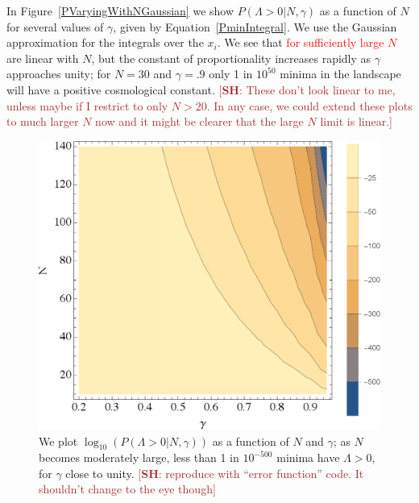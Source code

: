 \documentclass[12pt]{article}
\newcommand{\SH}[1]{\textcolor{brown}{[{\bf SH}: #1]}}
\newcommand{\LFL}[1]{\textcolor{red}{#1}}
\begin{document}
In  Figure~\ref{PVaryingWithNGaussian} we show $P(\Lambda>0|N,\gamma)$ as a function of $N$ for several values of $\gamma$, given by Equation~\ref{PminIntegral}. We use the Gaussian approximation for the integrals over the $x_i$. We see that \LFL{for sufficiently large $N$} are linear with $N$, but the constant of proportionality increases rapidly as $\gamma$ approaches unity; for $N=30$ and $\gamma = .9$ only 1 in $10^{50}$ minima in the landscape will have a positive cosmological constant. \SH{These don't look linear to me, unless maybe if I restrict to only $N>20$. In any case, we could extend these plots to much larger $N$ now and it might be clearer that the large $N$ limit is linear.}


\begin{figure} 
  \centering
  \includegraphics[width=.6 \linewidth]{histo.eps}
  \caption{We plot $\log_{10}(P(\Lambda>0|N,\gamma))$ as a function of $N$ and $\gamma$; as $N$ becomes moderately large, less than 1 in $10^{-500}$ minima have $\Lambda>0$, for $\gamma$  close to unity.  \SH{reproduce with ``error function'' code. It shouldn't change to the eye though}}
  \label{fullcontourplot}
\end{figure}
\end{document}
